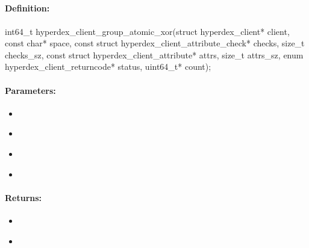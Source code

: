 \pagebreak
\subsection{}
\label{api:c:group_atomic_xor}


\paragraph{Definition:}
\begin{ccode}
int64_t hyperdex_client_group_atomic_xor(struct hyperdex_client* client,
        const char* space,
        const struct hyperdex_client_attribute_check* checks, size_t checks_sz,
        const struct hyperdex_client_attribute* attrs, size_t attrs_sz,
        enum hyperdex_client_returncode* status,
        uint64_t* count);
\end{ccode}

\paragraph{Parameters:}
\begin{itemize}[noitemsep]
\item {}\\

\item {}\\

\item {}\\

\item {}\\

\end{itemize}

\paragraph{Returns:}
\begin{itemize}[noitemsep]
\item {}\\

\item {}\\

\end{itemize}

